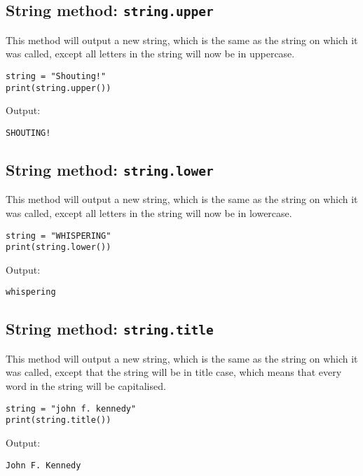 \documentclass[11pt]{article}
\begin{document}
 \newpage
\subsection{String method: \texttt{string.upper}}
\label{sec:org3aee143}
This method will output a new string, which is the same as the string on which it was called, except all letters in the string will now be in uppercase.

\begin{verbatim}
string = "Shouting!"
print(string.upper())
\end{verbatim}

 \noindent Output:

\label{orgbbb28a4}
\begin{verbatim}
SHOUTING!
\end{verbatim}
\subsection{String method: \texttt{string.lower}}
\label{sec:org3c12e88}
This method will output a new string, which is the same as the string on which it was called, except all letters in the string will now be in lowercase.

\begin{verbatim}
string = "WHISPERING"
print(string.lower())
\end{verbatim}

 \noindent Output:

\label{org834799d}
\begin{verbatim}
whispering
\end{verbatim}
\subsection{String method: \texttt{string.title}}
\label{sec:orga30f244}
This method will output a new string, which is the same as the string on which it was called, except that the string will be in title case, which means that every word in the string will be capitalised.

\begin{verbatim}
string = "john f. kennedy"
print(string.title())
\end{verbatim}

 \noindent Output:

\label{org226e02b}
\begin{verbatim}
John F. Kennedy
\end{verbatim}
\end{document}
